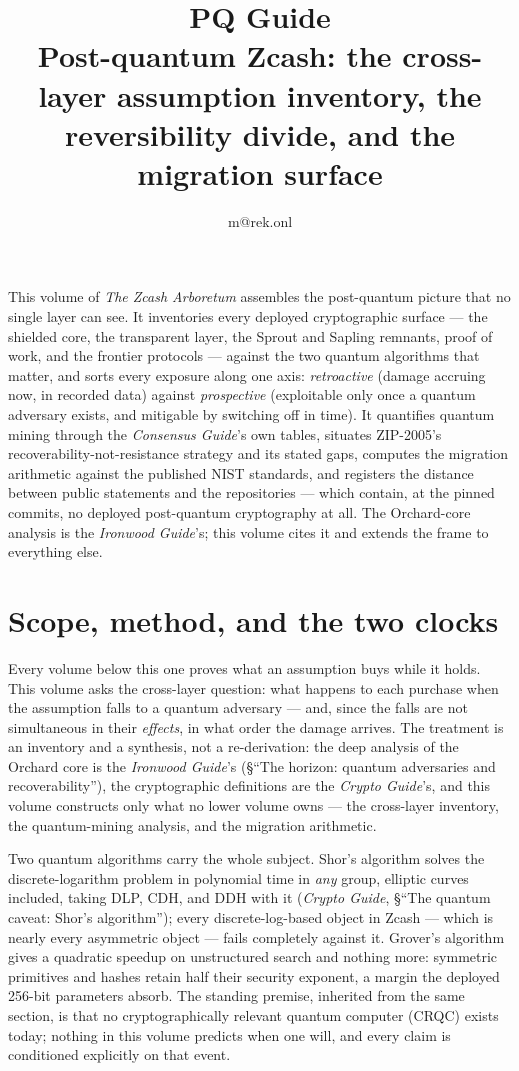 \documentclass[11pt,a4paper]{article}
\title{\textbf{\Huge PQ Guide}\\[6pt]\large Post-quantum Zcash: the cross-layer assumption inventory, the reversibility divide, and the migration surface}
\author{m@rek.onl}
\date{}
\theoremstyle{definition}
\renewenvironment{abstract}{%
  \small\begin{center}{\bfseries\abstractname}\end{center}\medskip\noindent\ignorespaces
}{\par\medskip}
\begin{document}
\maketitle
\thispagestyle{empty}
\begin{abstract}
This volume of \emph{The Zcash Arboretum} assembles the post-quantum
picture that no single layer can see. It inventories
every deployed cryptographic surface --- the shielded core, the
transparent layer, the Sprout and Sapling remnants, proof of work, and
the frontier protocols --- against the two quantum algorithms that
matter, and sorts every exposure along one axis: \emph{retroactive}
(damage accruing now, in recorded data) against \emph{prospective}
(exploitable only once a quantum adversary exists, and mitigable by
switching off in time). It quantifies quantum mining through the
\emph{Consensus Guide}'s own tables, situates ZIP-2005's
recoverability-not-resistance strategy and its stated gaps, computes the
migration arithmetic against the published NIST standards, and registers
the distance between public statements and the repositories --- which
contain, at the pinned commits, no deployed post-quantum cryptography at
all. The Orchard-core analysis is the \emph{Ironwood Guide}'s; this
volume cites it and extends the frame to everything else.
\end{abstract}
\clearpage
\tableofcontents
\clearpage

\section{Scope, method, and the two clocks}\label{sec:pq-scope}

Every volume below this one proves what an assumption buys while it
holds. This volume asks the cross-layer question: what happens to each
purchase when the assumption falls to a quantum adversary --- and, since
the falls are not simultaneous in their \emph{effects}, in what order
the damage arrives. The treatment is an inventory and a synthesis, not a
re-derivation: the deep analysis of the Orchard core is the
\emph{Ironwood Guide}'s (\S``The horizon: quantum adversaries and
recoverability''), the cryptographic definitions are the \emph{Crypto
Guide}'s, and this volume constructs only what no lower volume owns ---
the cross-layer inventory, the quantum-mining analysis, and the
migration arithmetic.

Two quantum algorithms carry the whole subject. Shor's algorithm solves
the discrete-logarithm problem in polynomial time in \emph{any} group,
elliptic curves included, taking DLP, CDH, and DDH with it (\emph{Crypto
Guide}, \S``The quantum caveat: Shor's algorithm''); every
discrete-log-based object in Zcash --- which is nearly every
asymmetric object --- fails completely against it. Grover's algorithm
gives a quadratic speedup on unstructured search and nothing more:
symmetric primitives and hashes retain half their security exponent, a
margin the deployed 256-bit parameters absorb. The standing premise,
inherited from the same section, is that no cryptographically relevant
quantum computer (CRQC) exists today; nothing in this volume predicts
when one will, and every claim is conditioned explicitly on that event.
\end{document}
